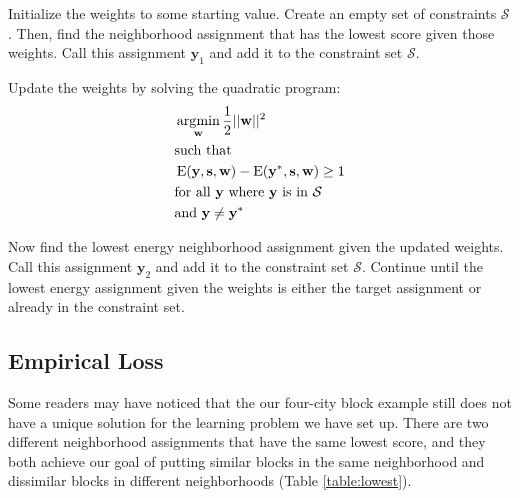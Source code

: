 Initialize the weights to some starting value. Create an empty set of
constraints $\mathcal{S}$. Then, find the neighborhood assignment that
has the lowest score given those weights. Call this assignment
$\mathbf{y}_1$ and add it to the constraint set $\mathcal{S}$.

Update the weights by solving the quadratic program: 
%
\begin{align*}
&\operatorname*{\arg\!\min}_{\mathbf{w}} \frac{1}{2}||\mathbf{w}||^2 \\
&\text{such that} \\
&\operatorname{E}(\mathbf{y}, \mathbf{s}, \mathbf{w})
- \operatorname{E}(\mathbf{y}^*, \mathbf{s}, \mathbf{w}) \geq 1 \\ 
&\text{for all } \mathbf{y} \text{ where } \mathbf{y} \text{ is in } \mathcal{S}\\
&\text{and } \mathbf{y} \neq \mathbf{y}^*
\end{align*}
%

Now find the lowest energy neighborhood assignment given the updated
weights. Call this assignment $\mathbf{y}_2$ and add it to the
constraint set $\mathcal{S}$. Continue until the lowest energy
assignment given the weights is either the target assignment or
already in the constraint set.\citep{szummer_learning_2008}


\subsection*{Empirical Loss}
Some readers may have noticed that the our four-city block example
still does not have a unique solution for the learning problem we have
set up. There are two different neighborhood assignments that have the
same lowest score, and they both achieve our goal of putting similar
blocks in the same neighborhood and dissimilar blocks in different
neighborhoods (Table \ref{table:lowest}).

